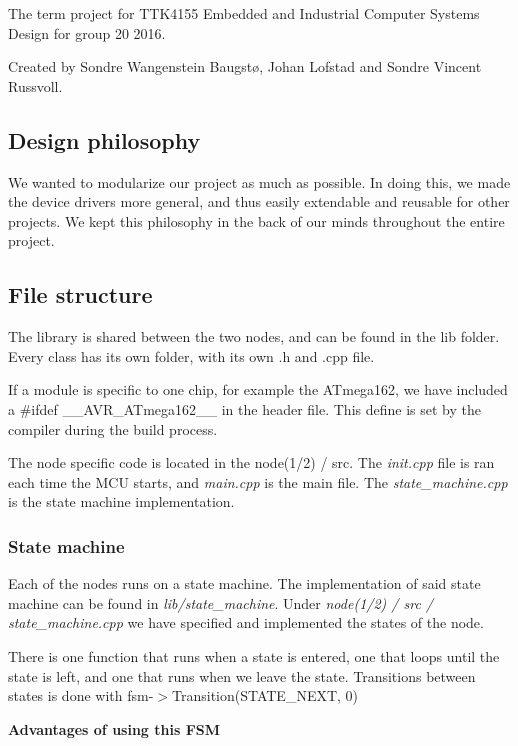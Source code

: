 The term project for T\+T\+K4155 Embedded and Industrial Computer Systems Design for group 20 2016.

Created by Sondre Wangenstein Baugstø, Johan Lofstad and Sondre Vincent Russvoll.

\subsection*{Design philosophy}

We wanted to modularize our project as much as possible. In doing this, we made the device drivers more general, and thus easily extendable and reusable for other projects. We kept this philosophy in the back of our minds throughout the entire project.

\subsection*{File structure}

The library is shared between the two nodes, and can be found in the lib folder. Every class has its own folder, with its own .h and .cpp file.

If a module is specific to one chip, for example the A\+Tmega162, we have included a {\ttfamily \#ifdef \+\_\+\+\_\+\+A\+V\+R\+\_\+\+A\+Tmega162\+\_\+\+\_\+} in the header file. This define is set by the compiler during the build process.

The node specific code is located in the node(1/2) / src. The {\itshape init.\+cpp} file is ran each time the M\+CU starts, and {\itshape main.\+cpp} is the main file. The {\itshape state\+\_\+machine.\+cpp} is the state machine implementation.

\subsubsection*{State machine}

Each of the nodes runs on a state machine. The implementation of said state machine can be found in {\itshape lib/state\+\_\+machine}. Under {\itshape node(1/2) / src / state\+\_\+machine.\+cpp} we have specified and implemented the states of the node.

There is one function that runs when a state is entered, one that loops until the state is left, and one that runs when we leave the state. Transitions between states is done with {\ttfamily fsm-\/$>$Transition(\+S\+T\+A\+T\+E\+\_\+\+N\+E\+X\+T, 0)}

{\bfseries Advantages of using this F\+SM}

